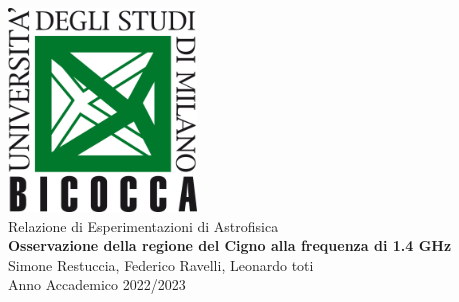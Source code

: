 \documentclass[a4paper,12pt]{article}
\begin{document}
	\begin{titlepage}
	\begin{center}
            \includegraphics[width=5cm]{logo.png}\\[20pt]
            {\Large Relazione di Esperimentazioni di Astrofisica}\\[30pt]
            {\Huge \bf Osservazione della regione del Cigno alla frequenza di 1.4 GHz}\\[30pt]
            {\Large Simone Restuccia, Federico Ravelli, Leonardo toti}\\[265pt]
            {\large Anno Accademico 2022/2023}
	\end{center}
	\end{titlepage}
	\newpage        
	\tableofcontents                        
	\clearpage\null\thispagestyle{empty}\newpage
	

	
	
	
	
	
	  
	
	\printbibliography   
	   
\end{document}

